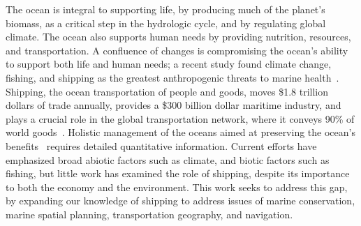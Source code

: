


The ocean is integral to supporting life, by producing much of the planet's biomass, as a critical step in the hydrologic cycle, and by regulating global climate. The ocean also supports human needs by providing nutrition, resources, and transportation. A confluence of changes is compromising the ocean's ability to support both life and human needs; a recent study found climate change, fishing, and shipping as the greatest anthropogenic threats to marine health~\citep{Halpern2008}.  Shipping, the ocean transportation of people and goods, moves \$1.8 trillion dollars of trade annually, provides a \$300 billion dollar maritime industry, and plays a crucial role in the global transportation network, where it conveys 90\% of world goods~\citep{oced2010,Rodrigue2009}. Holistic management of the oceans aimed at preserving the ocean's benefits~\citep{Lubchenco2010} requires detailed quantitative information. Current efforts have emphasized broad abiotic factors such as climate, and biotic factors such as fishing, but little work has examined the role of shipping, despite its importance to both the economy and the environment. This work seeks to address this gap, by expanding our knowledge of shipping to address issues of marine conservation, marine spatial planning, transportation geography, and navigation.



